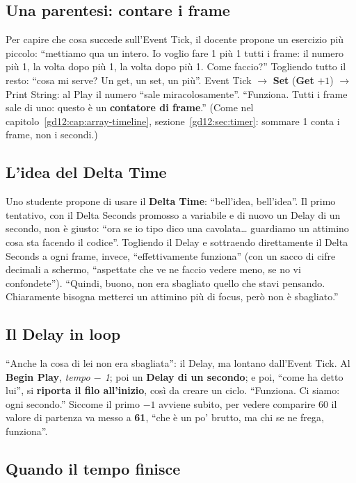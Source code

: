 \subsection{Una parentesi: contare i frame}

Per capire che cosa succede sull'Event Tick, il docente propone un esercizio più
piccolo: ``mettiamo qua un intero. Io voglio fare 1 più 1 tutti i frame: il
numero più 1, la volta dopo più 1, la volta dopo più 1. Come faccio?'' Togliendo
tutto il resto: ``cosa mi serve? Un get, un set, un più''. Event Tick
$\rightarrow$ \textbf{Set} (\textbf{Get} $+ 1$) $\rightarrow$ Print String: al
Play il numero ``sale miracolosamente''. ``Funziona. Tutti i frame sale di uno:
questo è un \textbf{contatore di frame}.'' (Come nel
capitolo~\ref{gd12:cap:array-timeline}, sezione~\ref{gd12:sec:timer}: sommare 1
conta i frame, non i secondi.)

\subsection{L'idea del Delta Time}

Uno studente propone di usare il \textbf{Delta Time}: ``bell'idea, bell'idea''.
Il primo tentativo, con il Delta Seconds promosso a variabile e di nuovo un
Delay di un secondo, non è giusto: ``ora se io tipo dico una cavolata\dots{}
guardiamo un attimino cosa sta facendo il codice''. Togliendo il Delay e
sottraendo direttamente il Delta Seconds a ogni frame, invece, ``effettivamente
funziona'' (con un sacco di cifre decimali a schermo, ``aspettate che ve ne
faccio vedere meno, se no vi confondete''). ``Quindi, buono, non era sbagliato
quello che stavi pensando. Chiaramente bisogna metterci un attimino più di
focus, però non è sbagliato.''

\subsection{Il Delay in loop}

``Anche la cosa di lei non era sbagliata'': il Delay, ma lontano dall'Event
Tick. Al \textbf{Begin Play}, \emph{tempo $-$ 1}; poi un \textbf{Delay di un
secondo}; e poi, ``come ha detto lui'', si \textbf{riporta il filo
all'inizio}, così da creare un ciclo. ``Funziona. Ci siamo: ogni secondo.''
Siccome il primo $-1$ avviene subito, per vedere comparire 60 il valore di
partenza va messo a \textbf{61}, ``che è un po' brutto, ma chi se ne frega,
funziona''.

\subsection{Quando il tempo finisce}

